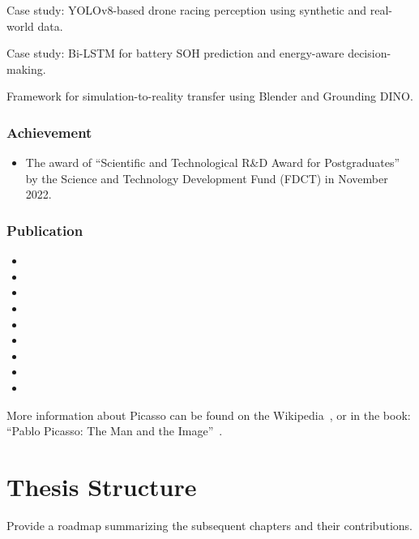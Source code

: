 Case study: YOLOv8-based drone racing perception using synthetic and real-world data.

Case study: Bi-LSTM for battery SOH prediction and energy-aware decision-making.

Framework for simulation-to-reality transfer using Blender and Grounding DINO.


\subsubsection{Achievement}

\begin{itemize}
	\item The award of ``Scientific and Technological R\&D Award for Postgraduates'' by the Science and Technology Development Fund (\gls{FDCT}) in November 2022.
\end{itemize}

\subsubsection{Publication}

\begin{itemize}\sloppy\emergencystretch=1em
	\item {}
	\item {}
	\item {}
	\item {}
	\item {}
	\item {}
	\item {}
	\item {}
	\item {}
\end{itemize}

More information about Picasso can be found on the Wikipedia~\cite{app_mono_camera}, or in the book: ``Pablo Picasso: The Man and the Image''~\cite{app_taxi}.


\section{Thesis Structure}

Provide a roadmap summarizing the subsequent chapters and their contributions.

\endinput